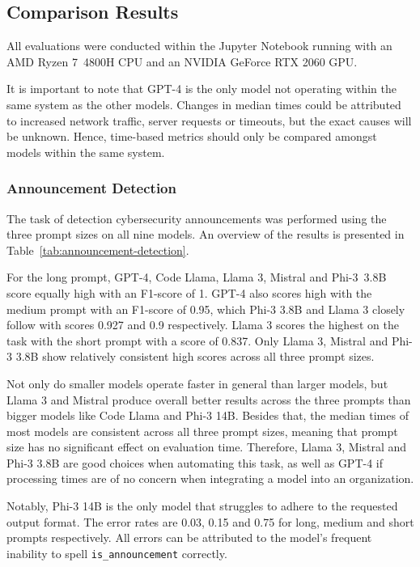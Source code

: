 \subsection{Comparison Results}
\label{subsec:rq3-comparison-results}

All evaluations were conducted within the Jupyter Notebook running with an AMD Ryzen 7\ 4800H CPU and an NVIDIA GeForce
RTX 2060 GPU\@.

It is important to note that GPT-4 is the only model not operating within the same system as the other models.
Changes in median times could be attributed to increased network traffic, server requests or timeouts, but the exact
causes will be unknown.
Hence, time-based metrics should only be compared amongst models within the same system.

\subsubsection{Announcement Detection}
The task of detection cybersecurity announcements was performed using the three prompt sizes on all nine models.
An overview of the results is presented in Table\ \ref{tab:announcement-detection}.



For the long prompt, GPT-4, Code Llama, Llama 3, Mistral and Phi-3\ 3.8B score equally high with an F1-score of 1.
GPT-4 also scores high with the medium prompt with an F1-score of 0.95, which Phi-3 3.8B and Llama 3 closely follow
with scores 0.927 and 0.9 respectively.
Llama 3 scores the highest on the task with the short prompt with a score of 0.837.
Only Llama 3, Mistral and Phi-3 3.8B show relatively consistent high scores across all three prompt sizes.

Not only do smaller models operate faster in general than larger models, but Llama 3 and Mistral produce overall better
results across the three prompts than bigger models like Code Llama and Phi-3 14B\@.
Besides that, the median times of most models are consistent across all three prompt sizes, meaning that prompt size has
no significant effect on evaluation time.
Therefore, Llama 3, Mistral and Phi-3 3.8B are good choices when automating this task, as well as GPT-4 if processing
times are of no concern when integrating a model into an organization.

Notably, Phi-3 14B is the only model that struggles to adhere to the requested output format.
The error rates are 0.03, 0.15 and 0.75 for long, medium and short prompts respectively.
All errors can be attributed to the model's frequent inability to spell \texttt{is\_announcement} correctly.

